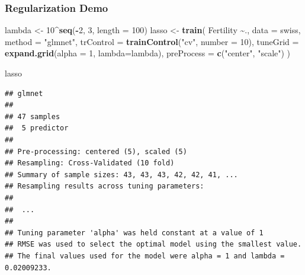 \documentclass[
  shownotes,
  xcolor={svgnames},
  hyperref={colorlinks,citecolor=DarkBlue,linkcolor=DarkRed,urlcolor=DarkBlue}
  , aspectratio=169]{beamer}
\newenvironment{Shaded}{\begin{snugshade}}{\end{snugshade}}
\newcommand{\DataTypeTok}[1]{\textcolor[rgb]{0.13,0.29,0.53}{#1}}
\newcommand{\DecValTok}[1]{\textcolor[rgb]{0.00,0.00,0.81}{#1}}
\newcommand{\KeywordTok}[1]{\textcolor[rgb]{0.13,0.29,0.53}{\textbf{#1}}}
\newcommand{\NormalTok}[1]{#1}
\newcommand{\OperatorTok}[1]{\textcolor[rgb]{0.81,0.36,0.00}{\textbf{#1}}}
\newcommand{\StringTok}[1]{\textcolor[rgb]{0.31,0.60,0.02}{#1}}
\begin{document}
\begin{frame}[fragile]
\frametitle{Regularization Demo}

\begin{scriptsize}
\begin{Shaded}
\begin{Highlighting}[]
\NormalTok{lambda \textless{}{-}}\StringTok{ }\DecValTok{10}\OperatorTok{\^{}}\KeywordTok{seq}\NormalTok{(}\OperatorTok{{-}}\DecValTok{2}\NormalTok{, }\DecValTok{3}\NormalTok{, }\DataTypeTok{length =} \DecValTok{100}\NormalTok{)}
\NormalTok{lasso \textless{}{-}}\StringTok{ }\KeywordTok{train}\NormalTok{(}
\NormalTok{  Fertility }\OperatorTok{\textasciitilde{}}\NormalTok{., }\DataTypeTok{data =}\NormalTok{ swiss, }\DataTypeTok{method =} \StringTok{"glmnet"}\NormalTok{,}
  \DataTypeTok{trControl =} \KeywordTok{trainControl}\NormalTok{(}\StringTok{"cv"}\NormalTok{, }\DataTypeTok{number =} \DecValTok{10}\NormalTok{),}
  \DataTypeTok{tuneGrid =} \KeywordTok{expand.grid}\NormalTok{(}\DataTypeTok{alpha =} \DecValTok{1}\NormalTok{, }\DataTypeTok{lambda=}\NormalTok{lambda), }\DataTypeTok{preProcess =} \KeywordTok{c}\NormalTok{(}\StringTok{"center"}\NormalTok{, }\StringTok{"scale"}\NormalTok{)}
\NormalTok{  )}

\NormalTok{lasso}
\end{Highlighting}
\end{Shaded}
\end{scriptsize}
\begin{tiny}


\begin{verbatim}
## glmnet 
## 
## 47 samples
##  5 predictor
## 
## Pre-processing: centered (5), scaled (5) 
## Resampling: Cross-Validated (10 fold) 
## Summary of sample sizes: 43, 43, 43, 42, 42, 41, ... 
## Resampling results across tuning parameters:
## 
##  ...
## 
## Tuning parameter 'alpha' was held constant at a value of 1
## RMSE was used to select the optimal model using the smallest value.
## The final values used for the model were alpha = 1 and lambda = 0.02009233.
\end{verbatim}
\end{tiny}
\end{frame}
\end{document}

